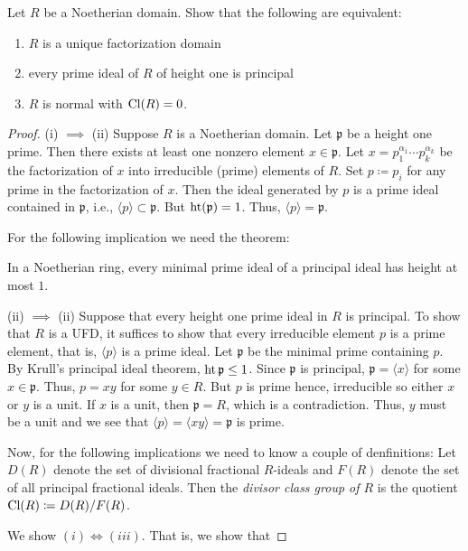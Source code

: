 \begin{problem}
Let $R$ be a Noetherian domain. Show that the following are equivalent:
\begin{enumerate}[label=(\roman*)]
\item $R$ is a unique factorization domain
\item every prime ideal of $R$ of height one is principal
\item $R$ is normal with $\operatorname{Cl}(R)=0$.
\end{enumerate}
\end{problem}
\begin{proof}
(i) $\implies$ (ii) Suppose $R$ is a Noetherian domain. Let $\mathfrak{p}$
be a height one prime. Then there exists at least one nonzero element
$x\in\mathfrak{p}$. Let $x=p_1^{\alpha_1}\cdots p_k^{\alpha_k}$ be the
factorization of $x$ into irreducible (prime) elements of $R$. Set
$p\coloneqq p_i$ for any prime in the factorization of $x$. Then the ideal
generated by $p$ is a prime ideal contained in $\mathfrak{p}$, i.e.,
$\langle p \rangle\subset\mathfrak{p}$. But $\operatorname{ht}(\mathfrak{p})=1$. Thus,
$\langle p \rangle=\mathfrak{p}$.

For the following implication we need the theorem:
\begin{theorem*}
In a Noetherian ring, every minimal prime ideal of a principal ideal has
height at most $1$.
\end{theorem*}

(ii) $\implies$ (ii) Suppose that every height one prime ideal in $R$ is
principal. To show that $R$ is a UFD, it suffices to show that every
irreducible element $p$ is a prime element, that is, $\langle p\rangle$ is
a prime ideal. Let $\mathfrak{p}$ be the minimal prime containing
$p$. By Krull's principal ideal theorem, $\operatorname{ht}\mathfrak{p}\leq 1$. Since
$\mathfrak{p}$ is principal, $\mathfrak{p}=\langle x\rangle$ for some
$x\in\mathfrak{p}$. Thus, $p=xy$ for some $y\in R$. But $p$ is prime hence,
irreducible so either $x$ or $y$ is a unit. If $x$ is a unit, then
$\mathfrak{p}=R$, which is a contradiction. Thus, $y$ must be a unit and we
see that $\langle p\rangle=\langle xy\rangle=\mathfrak{p}$ is prime.

Now, for the following implications we need to know a couple of
denfinitions: Let $D(R)$ denote the set of divisional fractional $R$-ideals
and $F(R)$ denote the set of all principal fractional ideals. Then the
\emph{divisor class group of $R$} is the quotient $\operatorname{Cl}(R)\coloneqq
D(R)/F(R)$.

We show $(i)\iff(iii)$. That is, we show that
\end{proof}

